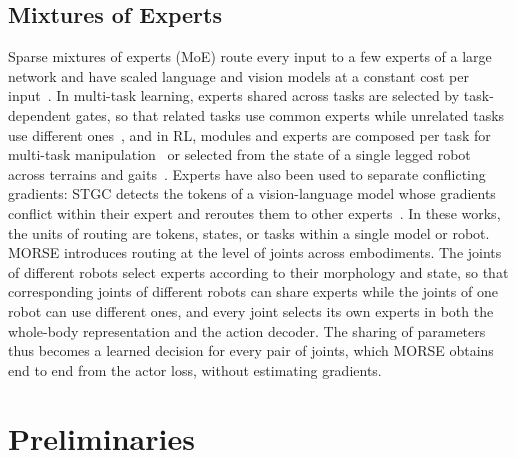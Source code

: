 \subsection{Mixtures of Experts}
Sparse mixtures of experts (MoE) route every input to a few experts of a large network and have scaled language and
vision models at a constant cost per
input~\citep{shazeer2017outrageously,lepikhin2021gshard,fedus2022switch,riquelme2021vmoe}. In multi-task learning,
experts shared across tasks are selected by task-dependent gates, so that
related tasks use common experts while unrelated tasks use different ones~\citep{ma2018mmoe,chen2023modsquad}, and in
RL, modules and experts are composed per task for multi-task
manipulation~\citep{yang2020softmodularization,sodhani2021care,sun2022paco,hendawy2024moore} or selected from the
state of a single legged robot across terrains and gaits~\citep{huang2025moeloco}. Experts have also been used to
separate conflicting gradients: STGC detects the tokens of a vision-language model whose gradients conflict within
their expert and reroutes them to other experts~\citep{yang2025stgc}. In these works, the units of routing are tokens,
states, or tasks within a single model or robot. MORSE introduces routing at the level of joints across embodiments.
The joints of different robots select experts according to their morphology and state, so that corresponding joints
of different robots can share experts while the joints of one robot can use different ones, and every joint selects
its own experts in both the whole-body representation and the action decoder. The sharing of parameters thus becomes
a learned decision for every pair of joints, which MORSE obtains end to end from the actor loss, without estimating
gradients.

\section{Preliminaries}
\label{sec:prelim}


